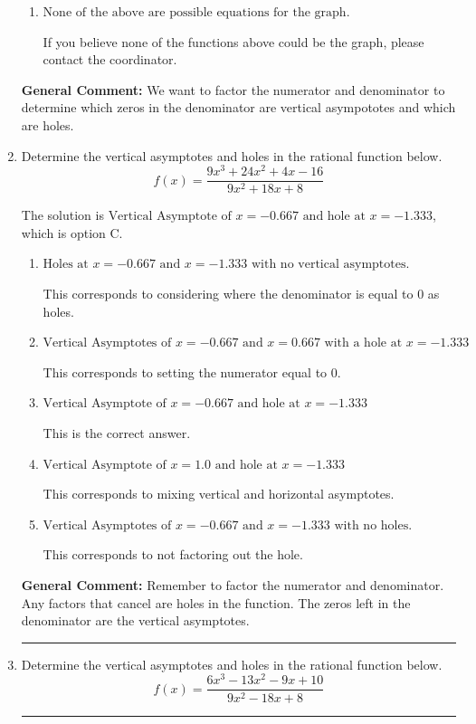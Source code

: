 \documentclass{extbook}[14pt]
\newcommand{\litem}[1]{\item #1

\rule{\textwidth}{0.4pt}}
\begin{document}
\begin{enumerate}
{\begin{enumerate}[label=\Alph*.]
You treated all of the zeros in the denominator as vertical asmptotes when some of them were holes and wrote factors as $x+z$.
\item \( \text{None of the above are possible equations for the graph.} \)

If you believe none of the functions above could be the graph, please contact the coordinator.
\end{enumerate}

\textbf{General Comment:} We want to factor the numerator and denominator to determine which zeros in the denominator are vertical asympototes and which are holes.
}
\litem{
Determine the vertical asymptotes and holes in the rational function below.
\[ f(x) = \frac{9x^{3} +24 x^{2} +4 x -16}{9x^{2} +18 x + 8} \]

The solution is \( \text{Vertical Asymptote of } x = -0.667 \text{ and hole at } x = -1.333 \), which is option C.\begin{enumerate}[label=\Alph*.]
\item \( \text{Holes at } x = -0.667 \text{ and } x = -1.333 \text{ with no vertical asymptotes.} \)

This corresponds to considering where the denominator is equal to 0 as holes.
\item \( \text{Vertical Asymptotes of } x = -0.667 \text{ and } x = 0.667 \text{ with a hole at } x = -1.333 \)

This corresponds to setting the numerator equal to 0.
\item \( \text{Vertical Asymptote of } x = -0.667 \text{ and hole at } x = -1.333 \)

This is the correct answer.
\item \( \text{Vertical Asymptote of } x = 1.0 \text{ and hole at } x = -1.333 \)

This corresponds to mixing vertical and horizontal asymptotes.
\item \( \text{Vertical Asymptotes of } x = -0.667 \text{ and } x = -1.333 \text{ with no holes.} \)

This corresponds to not factoring out the hole.
\end{enumerate}

\textbf{General Comment:} Remember to factor the numerator and denominator. Any factors that cancel are holes in the function. The zeros left in the denominator are the vertical asymptotes.
}
\litem{
Determine the vertical asymptotes and holes in the rational function below.
\[ f(x) = \frac{6x^{3} -13 x^{2} -9 x + 10}{9x^{2} -18 x + 8} \]

}
\end{enumerate}
\end{document}
